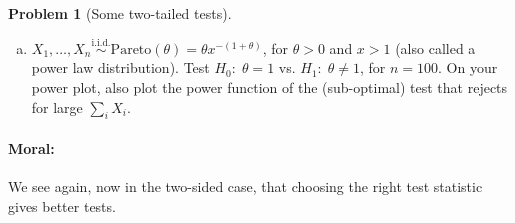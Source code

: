 \documentclass{article}
\newcommand{\simiid}{\overset{\text{i.i.d.}}{\sim}}
\theoremstyle{definition}
\newtheorem{problem}{Problem}
\begin{document}
\begin{problem}[Some two-tailed tests]
\begin{enumerate}[(a)]
\item $X_1,\ldots, X_n \simiid \text{Pareto}(\theta) = \theta x^{-(1+\theta)}$, for $\theta > 0$ and $x > 1$ (also called a power law distribution). Test $H_0:\; \theta = 1$ vs. $H_1:\; \theta \neq 1$, for $n = 100$. On your power plot, also plot the power function of the (sub-optimal) test that rejects for large $\sum_i X_i$.


\end{enumerate}

\paragraph{Moral:} We see again, now in the two-sided case, that choosing the right test statistic gives better tests.

\end{problem}
\end{document}
